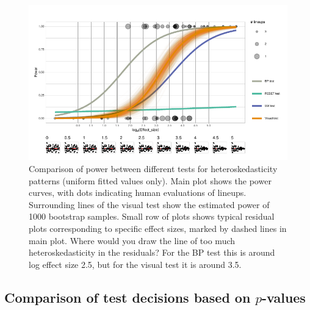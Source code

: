 \documentclass[]{interact}
\theoremstyle{plain}%
\theoremstyle{definition}
\theoremstyle{remark}
\begin{document}
\begin{figure}

{\centering \includegraphics[width=1\linewidth]{paper_comparison_files/figure-latex/heterpower-1} 

}

\caption{Comparison of power between different tests for heteroskedasticity patterns (uniform fitted values only). Main plot shows the power curves, with dots indicating human evaluations of lineups. Surrounding lines of the visual test show the estimated power of 1000 bootstrap samples. Small row of plots shows typical residual plots corresponding to specific effect sizes, marked by dashed lines in main plot. Where would you draw the line of too much heteroskedasticity in the residuals? For the BP test this is around log effect size 2.5, but for the visual test it is around 3.5.}\label{fig:heterpower}
\end{figure}

\hypertarget{comparison-of-test-decisions-based-on-p-values}{%
\subsection{\texorpdfstring{Comparison of test decisions based on
\(p\)-values}{Comparison of test decisions based on p-values}}\label{comparison-of-test-decisions-based-on-p-values}}
\end{document}
